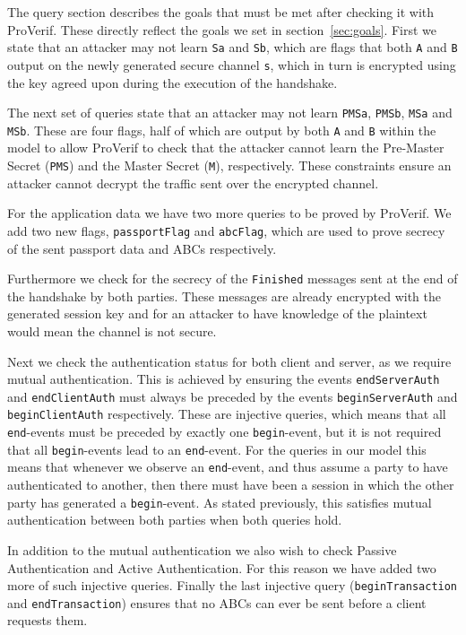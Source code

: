 The query section describes the goals that must be met after checking it with ProVerif. These directly reflect the goals we set in section~\ref{sec:goals}. First we state that an attacker may not learn \texttt{Sa} and \texttt{Sb}, which are flags that both \texttt{A} and \texttt{B} output on the newly generated secure channel \texttt{s}, which in turn is encrypted using the key agreed upon during the execution of the handshake.

The next set of queries state that an attacker may not learn \texttt{PMSa}, \texttt{PMSb}, \texttt{MSa} and \texttt{MSb}. These are four flags, half of which are output by both \texttt{A} and \texttt{B} within the model to allow ProVerif to check that the attacker cannot learn the Pre-Master Secret (\texttt{PMS}) and the Master Secret (\texttt{M}), respectively. These constraints ensure an attacker cannot decrypt the traffic sent over the encrypted channel.

For the application data we have two more queries to be proved by ProVerif. We add two new flags, \texttt{passportFlag} and \texttt{abcFlag}, which are used to prove secrecy of the sent passport data and ABCs respectively.

Furthermore we check for the secrecy of the \texttt{Finished} messages sent at the end of the handshake by both parties. These messages are already encrypted with the generated session key and for an attacker to have knowledge of the plaintext would mean the channel is not secure.

Next we check the authentication status for both client and server, as we require mutual authentication. This is achieved by ensuring the events \texttt{endServerAuth} and \texttt{endClientAuth} must always be preceded by the events \texttt{beginServerAuth} and \texttt{beginClientAuth} respectively. These are injective queries, which means that all \texttt{end}-events must be preceded by exactly one \texttt{begin}-event, but it is not required that all \texttt{begin}-events lead to an \texttt{end}-event. For the queries in our model this means that whenever we observe an \texttt{end}-event, and thus assume a party to have authenticated to another, then there must have been a session in which the other party has generated a \texttt{begin}-event. As stated previously, this satisfies mutual authentication between both parties when both queries hold.

In addition to the mutual authentication we also wish to check Passive Authentication and Active Authentication. For this reason we have added two more of such injective queries. Finally the last injective query (\texttt{beginTransaction} and \texttt{end\-Transaction}) ensures that no ABCs can ever be sent before a client requests them.

